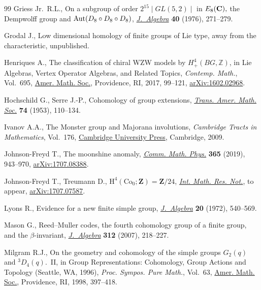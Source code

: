\documentclass[pdftex]{sigma}
\numberwithin{equation}{section}
\newcommand\<\langle
\renewcommand\>\rangle
\begin{document}
\begin{thebibliography}{99}
Griess Jr.~R.L., On a subgroup of order {$2^{15}\mid GL(5,2)\mid $} in
 {$E_{8}({\bf C}),$} the {D}empwolff group and {${\rm Aut}(D_{8}\circ
 D_{8}\circ D_{8})$}, \href{https://doi.org/10.1016/0021-8693(76)90097-1}{\textit{J.~Algebra}} \textbf{40} (1976), 271--279.

Grodal J., Low dimensional homology of finite groups of {L}ie type, away from
 the characteristic, unpublished.

Henriques A., The classification of chiral {WZW} models by {$H^4_+(BG,{\mathbb
 Z})$}, in Lie Algebras, Vertex Operator Algebras, and Related Topics,
\textit{Contemp. Math.}, Vol.~695, \href{https://doi.org/10.1090/conm/695/13998}{Amer. Math. Soc.}, Providence, RI, 2017,
 99--121, \href{https://arxiv.org/abs/1602.02968}{arXiv:1602.02968}.

Hochschild G., Serre J.-P., Cohomology of group extensions, \href{https://doi.org/10.2307/1990851}{\textit{Trans. Amer.
 Math. Soc.}} \textbf{74} (1953), 110--134.

Ivanov A.A., The {M}onster group and {M}ajorana involutions, \textit{Cambridge
 Tracts in Mathematics}, Vol.~176, \href{https://doi.org/10.1017/CBO9780511576812}{Cambridge University Press}, Cambridge,
 2009.

Johnson-Freyd T., The moonshine anomaly, \href{https://doi.org/10.1007/s00220-019-03300-2}{\textit{Comm. Math. Phys.}}
 \textbf{365} (2019), 943--970, \href{https://arxiv.org/abs/1707.08388}{arXiv:1707.08388}.

Johnson-Freyd T., Treumann D., $\mathrm{H}^4(\mathrm{Co}_0;\mathbf{Z}) =
 \mathbf{Z}/24$, \href{https://doi.org/10.1093/imrn/rny219}{\textit{Int. Math. Res. Not.}}, {t}o appear,
 \href{https://arxiv.org/abs/1707.07587}{arXiv:1707.07587}.

Lyons R., Evidence for a new finite simple group, \href{https://doi.org/10.1016/0021-8693(72)90072-5}{\textit{J.~Algebra}}
 \textbf{20} (1972), 540--569.

Mason G., Reed--{M}uller codes, the fourth cohomology group of a finite group,
 and the {$\beta$}-invariant, \href{https://doi.org/10.1016/j.jalgebra.2006.10.036}{\textit{J.~Algebra}} \textbf{312} (2007),
 218--227.

Milgram R.J., On the geometry and cohomology of the simple groups {$G_2(q)$}
 and {$^3\!D_4(q)$}.~{II}, in Group Representations: Cohomology, Group Actions
 and Topology ({S}eattle, {WA}, 1996), \textit{Proc. Sympos. Pure Math.},
 Vol.~63, \href{https://doi.org/10.1090/pspum/063/1603199}{Amer. Math. Soc.}, Providence, RI, 1998, 397--418.


\end{thebibliography}
\end{document}
